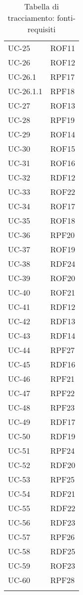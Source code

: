 \begin{longtable}{| p{5cm} | p{5cm} |}
		UC-25 & ROF11 \\
		UC-26 & ROF12 \\
		\rowcolor{LightGray}
		UC-26.1 & RPF17 \\
		UC-26.1.1 & RPF18\\
		\rowcolor{LightGray}
		UC-27 & ROF13 \\
		UC-28 & RPF19 \\
		\rowcolor{LightGray}
		UC-29 & ROF14 \\
		UC-30 & ROF15 \\
		\rowcolor{LightGray}
		UC-31 & ROF16 \\
		UC-32 & RDF12\\
		\rowcolor{LightGray}
		UC-33 & ROF22\\
		UC-34 & ROF17\\
		\rowcolor{LightGray}
		UC-35 & ROF18\\
		UC-36 & RPF20\\
		\rowcolor{LightGray}
		UC-37 & ROF19\\
		UC-38 & RDF24\\
		\rowcolor{LightGray}
		UC-39 & ROF20\\
		UC-40 & ROF21\\
		\rowcolor{LightGray}
		UC-41 & RDF12\\
		UC-42 & RDF13\\
		\rowcolor{LightGray}
		UC-43 & RDF14\\
		UC-44 & RPF27\\
		\rowcolor{LightGray}
		UC-45 & RDF16\\
		UC-46 & RPF21\\
		\rowcolor{LightGray}
		UC-47 & RPF22\\
		UC-48 & RPF23\\
		\rowcolor{LightGray}
		UC-49 & RDF17 \\
		UC-50 & RDF19 \\
		\rowcolor{LightGray}
		UC-51 & RPF24 \\
		UC-52 & RDF20 \\
		\rowcolor{LightGray}
		UC-53 & RPF25 \\
		UC-54 & RDF21 \\
		\rowcolor{LightGray}
		UC-55 & RDF22 \\
		UC-56 & RDF23 \\
		\rowcolor{LightGray}
		UC-57 & RPF26 \\
		UC-58 & RDF25\\
		\rowcolor{LightGray}
		UC-59 & ROF23\\
		UC-60 & RPF28\\
		\rowcolor{LightGray}
		\hline
		\caption{Tabella di tracciamento: fonti-requisiti}
\end{longtable}
